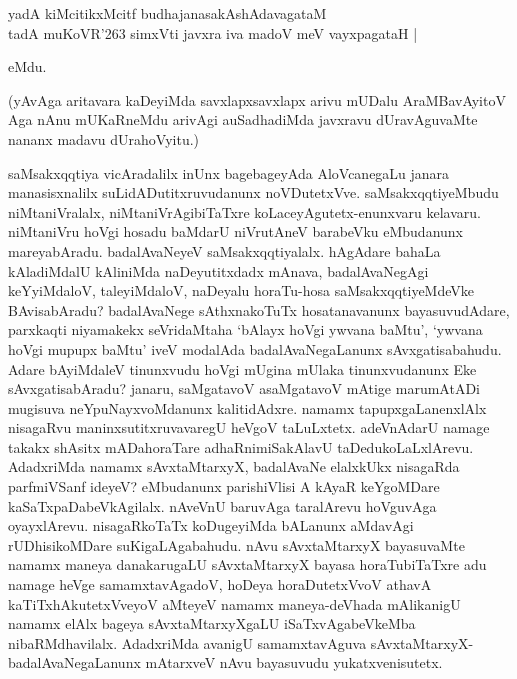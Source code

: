 \medskip
 
 \begin{shloka}
yadA kiMcitikxMcitf budhajanasakAshAdavagataM \\
tadA muKoVR\char'263 simxVti javxra iva madoV meV vayxpagataH |\\
 \end{shloka}
eMdu.

\newpage

 \noindent
(yAvAga aritavara kaDeyiMda savxlapxsavxlapx arivu mUDalu AraMBavAyitoV Aga nAnu mUKaRneMdu arivAgi auSadhadiMda javxravu dUravAguvaMte nananx madavu dUrahoVyitu.)

saMsakxqqtiya vicAradalilx inUnx bagebageyAda AloVcanegaLu janara manasisxnalilx suLidADutitxruvudanunx noVDutetxVve. saMsakxqqtiyeMbudu niMtaniVralalx, niMtaniVrAgibiTaTxre koLaceyAgutetx-enunxvaru kelavaru. niMtaniVru hoVgi hosadu baMdarU niVrutAneV barabeVku eMbudanunx mareyabAradu. badalAvaNeyeV saMsakxqqtiyalalx. hAgAdare bahaLa kAladiMdalU kAliniMda naDeyutitxdadx mAnava, badalAvaNegAgi keYyiMdaloV, taleyiMdaloV, naDeyalu horaTu-hosa saMsakxqqtiyeMdeVke BAvisabAradu? badalAvaNege sAthxnakoTuTx hosatanavanunx bayasuvudAdare, parxkaqti niyamakekx seVridaMtaha `bAlayx hoVgi ywvana baMtu', `ywvana hoVgi mupupx baMtu' iveV modalAda badalAvaNegaLanunx sAvxgatisabahudu. Adare bAyiMdaleV tinunxvudu hoVgi mUgina mUlaka tinunxvudanunx Eke sAvxgatisabAradu? janaru, saMgatavoV asaMgatavoV mAtige marumAtADi mugisuva neYpuNayxvoMdanunx kalitidAdxre. namamx tapupxgaLanenxlAlx nisagaRvu maninxsutitxruvavaregU heVgoV taLuLxtetx. adeVnAdarU namage takakx shAsitx mADahoraTare adhaRnimiSakAlavU taDedukoLaLxlArevu. AdadxriMda namamx sAvxtaMtarxyX, badalAvaNe elalxkUkx nisagaRda parfmiVSanf ideyeV? eMbudanunx parishiVlisi A kAyaR keYgoMDare kaSaTxpaDabeVkAgilalx. nAveVnU baruvAga taralArevu hoVguvAga oyayxlArevu. nisagaRkoTaTx koDugeyiMda bALanunx aMdavAgi rUDhisikoMDare suKigaLAgabahudu. nAvu sAvxtaMtarxyX bayasuvaMte namamx maneya danakarugaLU sAvxtaMtarxyX bayasa horaTubiTaTxre adu namage heVge samamxtavAgadoV, hoDeya horaDutetxVvoV athavA kaTiTxhAkutetxVveyoV aMteyeV namamx maneya-deVhada mAlikanigU namamx elAlx bageya sAvxtaMtarxyXgaLU iSaTxvAgabeVkeMba nibaRMdhavilalx. AdadxriMda avanigU samamxtavAguva sAvxtaMtarxyX-badalAvaNegaLanunx mAtarxveV nAvu bayasuvudu yukatxvenisutetx.

